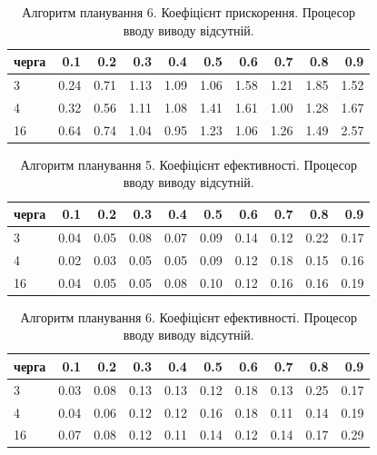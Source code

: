 \begin{table}[H]
\caption{Алгоритм планування 6. Коефіцієнт прискорення. Процесор вводу виводу відсутній.}
\label{tab:big_table}
\centering
\begin{tabular}{lrrrrrrrrr}
\toprule
черга &   0.1 &   0.2 &   0.3 &   0.4 &   0.5 &   0.6 &   0.7 &   0.8 &   0.9 \\
\midrule
3 & 0.24 & 0.71 & 1.13 & 1.09 & 1.06 & 1.58 & 1.21 & 1.85 & 1.52 \\
4 & 0.32 & 0.56 & 1.11 & 1.08 & 1.41 & 1.61 & 1.00 & 1.28 & 1.67 \\
16 & 0.64 & 0.74 & 1.04 & 0.95 & 1.23 & 1.06 & 1.26 & 1.49 & 2.57 \\
\bottomrule
\end{tabular}
\end{table}


\begin{table}[H]
\caption{Алгоритм планування 5. Коефіцієнт ефективності. Процесор вводу виводу відсутній.}
\label{tab:big_table}
\centering
\begin{tabular}{lrrrrrrrrr}
\toprule
черга &   0.1 &   0.2 &   0.3 &   0.4 &   0.5 &   0.6 &   0.7 &   0.8 &   0.9 \\
\midrule
3 & 0.04 & 0.05 & 0.08 & 0.07 & 0.09 & 0.14 & 0.12 & 0.22 & 0.17 \\
4 & 0.02 & 0.03 & 0.05 & 0.05 & 0.09 & 0.12 & 0.18 & 0.15 & 0.16 \\
16 & 0.04 & 0.05 & 0.05 & 0.08 & 0.10 & 0.12 & 0.16 & 0.16 & 0.19 \\
\bottomrule
\end{tabular}
\end{table}

\begin{table}[H]
\caption{Алгоритм планування 6. Коефіцієнт ефективності. Процесор вводу виводу відсутній.}
\label{tab:big_table}
\centering
\begin{tabular}{lrrrrrrrrr}
\toprule
черга &   0.1 &   0.2 &   0.3 &   0.4 &   0.5 &   0.6 &   0.7 &   0.8 &   0.9 \\
\midrule
3 & 0.03 & 0.08 & 0.13 & 0.13 & 0.12 & 0.18 & 0.13 & 0.25 & 0.17 \\
4 & 0.04 & 0.06 & 0.12 & 0.12 & 0.16 & 0.18 & 0.11 & 0.14 & 0.19 \\
16 & 0.07 & 0.08 & 0.12 & 0.11 & 0.14 & 0.12 & 0.14 & 0.17 & 0.29 \\
\bottomrule
\end{tabular}
\end{table}

